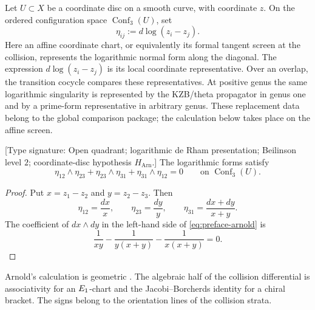 Let \(U\subset X\) be a coordinate disc on a smooth curve, with
coordinate \(z\).  On the ordered configuration space
\(\operatorname{Conf}_3(U)\), set
\begin{equation}\label{eq:pf1-eta}
 \eta_{ij}:=d\log(z_i-z_j).
\end{equation}
Here an affine coordinate chart, or equivalently its formal tangent
screen at the collision, represents the logarithmic normal form along
the diagonal.  The expression \(d\log(z_i-z_j)\) is its local
coordinate representative.  Over an overlap, the transition cocycle
compares these representatives.  At positive
genus the same logarithmic singularity is represented by the KZB/theta
propagator in genus one and by a prime-form representative in arbitrary
genus.  These replacement data belong to the global comparison
package; the calculation below takes place on the affine screen.

\begin{proposition}
\label{prop:preface-arnold}
\textup{[Type signature: Open quadrant; logarithmic de Rham
presentation; Beilinson level \(2\); coordinate-disc hypothesis
\(H_{\mathrm{Arn}}\).]}
The logarithmic forms satisfy
\begin{equation}\label{eq:preface-arnold}
 \eta_{12}\wedge\eta_{23}
 +\eta_{23}\wedge\eta_{31}
 +\eta_{31}\wedge\eta_{12}=0
 \qquad\text{on }\operatorname{Conf}_3(U).
\end{equation}
\end{proposition}

\begin{proof}
Put \(x=z_1-z_2\) and \(y=z_2-z_3\).  Then
\[
 \eta_{12}=\frac{dx}{x},\qquad
 \eta_{23}=\frac{dy}{y},\qquad
 \eta_{31}=\frac{dx+dy}{x+y}.
\]
The coefficient of \(dx\wedge dy\) in the left-hand side of
\eqref{eq:preface-arnold} is
\[
 \frac1{xy}-\frac1{y(x+y)}-\frac1{x(x+y)}=0.
\]
\end{proof}

Arnold's calculation is geometric
\cite{Arnold69}.  The algebraic half of the collision differential is
associativity for an \(E_1\)-chart and the Jacobi--Borcherds identity
for a chiral bracket.  The signs belong to the orientation lines of
the collision strata.

